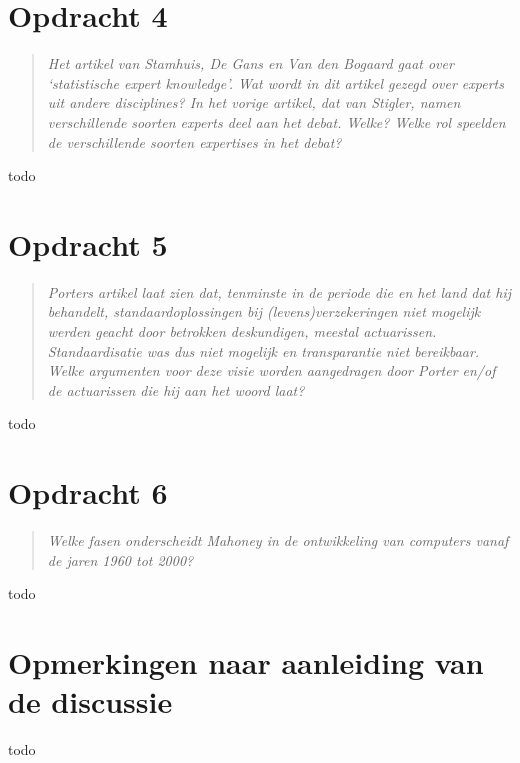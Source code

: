 \documentclass[a4paper,11pt]{article}
\begin{document}
\section*{Opdracht 4}


\begin{quote}
\emph{Het artikel van Stamhuis, De Gans en Van den Bogaard gaat over
  `statistische expert knowledge'. Wat wordt in dit artikel gezegd over
  experts uit andere disciplines? In het vorige artikel, dat van Stigler,
  namen verschillende soorten experts deel aan het debat. Welke? Welke rol
  speelden de verschillende soorten expertises in het debat?}
\end{quote}


todo


\section*{Opdracht 5}


\begin{quote}
\emph{Porters artikel laat zien dat, tenminste in de periode die en het land
  dat hij behandelt, standaardoplossingen bij (levens)verzekeringen niet
  mogelijk werden geacht door betrokken deskundigen, meestal
  actuarissen. Standaardisatie was dus niet mogelijk en transparantie niet
  bereikbaar. Welke argumenten voor deze visie worden aangedragen door Porter
  en/of de actuarissen die hij aan het woord laat?}
\end{quote}


todo


\section*{Opdracht 6}


\begin{quote}
\emph{Welke fasen onderscheidt Mahoney in de ontwikkeling van computers vanaf
  de jaren 1960 tot 2000?}
\end{quote}


todo


\section*{Opmerkingen naar aanleiding van de discussie}


todo
\end{document}
